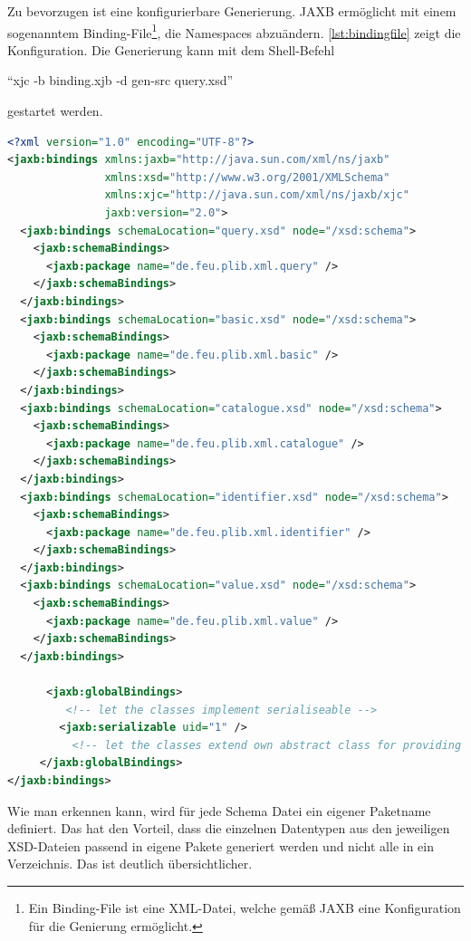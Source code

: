 Zu bevorzugen ist eine konfigurierbare Generierung. \gls{JAXB} ermöglicht mit einem sogenanntem Binding-File\footnote{Ein Binding-File ist eine XML-Datei, welche gemäß JAXB eine Konfiguration für die Genierung ermöglicht.}, die \Glspl{Namespace} abzuändern. \autoref{lst:bindingfile} zeigt die Konfiguration. Die Generierung kann mit dem Shell-Befehl 

\enquote{xjc -b binding.xjb -d gen-src query.xsd} 

gestartet werden.  

\begin{lstlisting}[caption=Binding File binding.xjc, language=XML, label=lst:bindingfile]
<?xml version="1.0" encoding="UTF-8"?>
<jaxb:bindings xmlns:jaxb="http://java.sun.com/xml/ns/jaxb"
               xmlns:xsd="http://www.w3.org/2001/XMLSchema"
               xmlns:xjc="http://java.sun.com/xml/ns/jaxb/xjc"
               jaxb:version="2.0">
  <jaxb:bindings schemaLocation="query.xsd" node="/xsd:schema">
    <jaxb:schemaBindings>
      <jaxb:package name="de.feu.plib.xml.query" />
    </jaxb:schemaBindings>
  </jaxb:bindings>
  <jaxb:bindings schemaLocation="basic.xsd" node="/xsd:schema">
    <jaxb:schemaBindings>
      <jaxb:package name="de.feu.plib.xml.basic" />
    </jaxb:schemaBindings>
  </jaxb:bindings>
  <jaxb:bindings schemaLocation="catalogue.xsd" node="/xsd:schema">
    <jaxb:schemaBindings>
      <jaxb:package name="de.feu.plib.xml.catalogue" />
    </jaxb:schemaBindings>
  </jaxb:bindings>
  <jaxb:bindings schemaLocation="identifier.xsd" node="/xsd:schema">
    <jaxb:schemaBindings>
      <jaxb:package name="de.feu.plib.xml.identifier" />
    </jaxb:schemaBindings>
  </jaxb:bindings>
  <jaxb:bindings schemaLocation="value.xsd" node="/xsd:schema">
    <jaxb:schemaBindings>
      <jaxb:package name="de.feu.plib.xml.value" />
    </jaxb:schemaBindings>
  </jaxb:bindings> 
  
      <jaxb:globalBindings>
         <!-- let the classes implement serialiseable -->
        <jaxb:serializable uid="1" />
          <!-- let the classes extend own abstract class for providing some extra functionality for each one -->
     </jaxb:globalBindings>  
</jaxb:bindings> 
\end{lstlisting}

Wie man erkennen kann, wird für jede Schema Datei ein eigener Paketname definiert. Das hat den Vorteil, dass die einzelnen Datentypen aus den jeweiligen XSD-Dateien passend in eigene Pakete generiert werden und nicht alle in ein Verzeichnis. Das ist deutlich übersichtlicher. 

